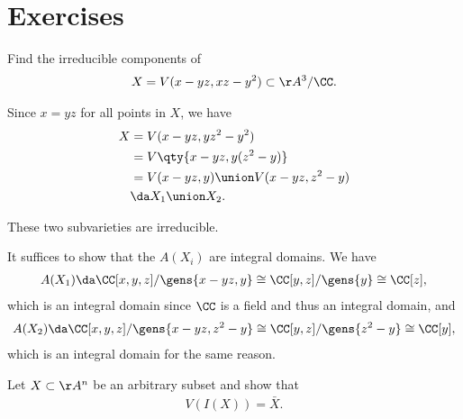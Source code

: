 \hypertarget{exercises-1}{%
\section{Exercises}\label{exercises-1}}

\begin{exercise}[Gathmann 2.17]

Find the irreducible components of
\begin{align*}  
X = V(x - yz, xz - y^2) \subset \AA^3/\CC
.\end{align*}

\end{exercise}

\begin{solution}

Since \(x=yz\) for all points in \(X\), we have
\begin{align*}  
X &= V(x-yz, yz^2 - y^2) \\
&= V\qty{x-yz, y(z^2 - y) } \\
&= V(x-yz, y) \union V(x-yz, z^2-y) \\
&\da X_1 \union X_2
.\end{align*}

\begin{claim}

These two subvarieties are irreducible.

\end{claim}

It suffices to show that the \(A(X_i)\) are integral domains. We have
\begin{align*}  
A(X_1) \da \CC[x,y,z] / \gens{x-yz, y} \cong \CC[y,z]/\gens{y} \cong \CC[z]
,\end{align*} which is an integral domain since \(\CC\) is a field and
thus an integral domain, and
\begin{align*}  
A(X_2) \da \CC[x,y,z]/\gens{x-yz, z^2 - y} \cong \CC[y,z]/\gens{z^2-y} \cong \CC[y]
,\end{align*} which is an integral domain for the same reason.

\end{solution}

\begin{exercise}[Gathmann 2.18]

Let \(X\subset \AA^n\) be an arbitrary subset and show that
\begin{align*}  
V(I(X)) = \bar{X}
.\end{align*}

\end{exercise}

